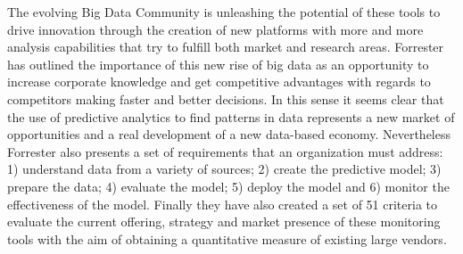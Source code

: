 The evolving Big Data Community is unleashing the potential of these tools 
to drive innovation through the creation of new platforms with more 
and more analysis capabilities that try to fulfill both market 
and research areas. Forrester~\cite{forrester} has outlined the importance of 
this new rise of big data as an opportunity to increase corporate knowledge 
and get competitive advantages with regards to competitors making 
faster and better decisions. In this sense it seems clear that the use of 
predictive analytics to find patterns in data represents a new 
market of opportunities and a real development of a 
new data-based economy. Nevertheless Forrester also presents a set 
of requirements that an organization must address: 
1) understand data from a variety of sources; 2) create the predictive model; 
3) prepare the data; 4) evaluate the model; 5) deploy the model and 
6) monitor the effectiveness of the model. Finally they have also created 
a set of 51 criteria to evaluate the current offering, strategy 
and market presence of these monitoring tools with the aim of 
obtaining a quantitative measure of existing large vendors.




% 
% 
% 
% 
